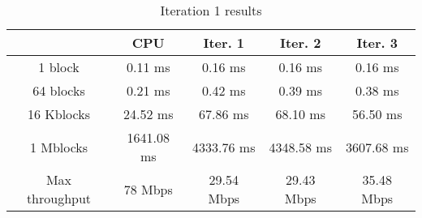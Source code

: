 \begin{table}
	\caption{Iteration 1 results}
	\centering
	\begin{tabular}{ccccc}
		\toprule
		 & CPU & Iter. 1 & Iter. 2 & Iter. 3 \\
		\midrule
		1 block & 0.11 ms & 0.16 ms & 0.16 ms & 0.16 ms \\
		64 blocks & 0.21 ms & 0.42 ms & 0.39 ms & 0.38 ms \\
		16 Kblocks & 24.52 ms & 67.86 ms & 68.10 ms & 56.50 ms \\
		1 Mblocks & 1641.08 ms & 4333.76 ms & 4348.58 ms & 3607.68 ms \\
		Max throughput & 78 Mbps & 29.54 Mbps & 29.43 Mbps & 35.48 Mbps \\
		\bottomrule
	\end{tabular}
\end{table}
